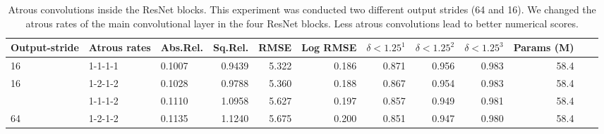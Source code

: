 \begin{table}[h]
    \centering
    \begin{tabular}{lllrrrrrrrrr}
    \toprule
     Output-stride & Atrous rates &  Abs.Rel. &  Sq.Rel. &   RMSE &  Log RMSE &     $\delta < 1.25^1$ &     $\delta < 1.25^2$ &     $\delta < 1.25^3$ &      Params (M)\\
    \midrule 
           16  &  1-1-1-1 &   0.1007 &     0.9439 &      5.322 &      0.186 &      0.871 &      0.956 &      0.983 & 58.4\\
           16  &  1-2-1-2 &   0.1028 &     0.9788 &      5.360 &      0.188 &      0.867 &      0.954 &      0.983 & 58.4\\
    \addlinespace
           64  &  1-1-1-2 &  0.1110 &     1.0958 &      5.627 &      0.197 &      0.857 &      0.949 &      0.981 & 58.4\\
           64  &  1-2-1-2 &  0.1135 &     1.1240 &      5.675 &      0.200 &      0.851 &      0.947 &      0.980 & 58.4\\
    \bottomrule
    \end{tabular}
    \caption{Atrous convolutions inside the ResNet blocks. This experiment was conducted two different output strides (64 and 16). We changed the atrous rates of the main convolutional layer in the four ResNet blocks. Less atrous convolutions lead to better numerical scores.}
    \label{table:appendix:atrous-encoder}
\end{table}